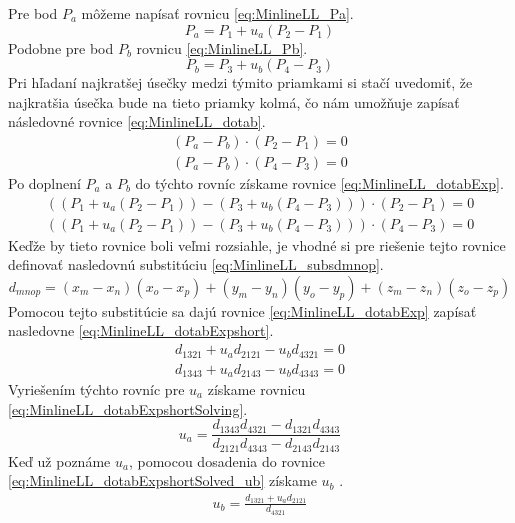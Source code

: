 Pre bod $P_a$ môžeme napísať rovnicu  \ref{eq:MinlineLL_Pa}.
\begin{equation}
P_a=P_1 + u_a(P_2-P_1)
    \label{eq:MinlineLL_Pa}
\end{equation}
Podobne pre bod $P_b$ rovnicu \ref{eq:MinlineLL_Pb}.
\begin{equation}
P_b=P_3 + u_b(P_4-P_3)
    \label{eq:MinlineLL_Pb}
\end{equation}
Pri hľadaní najkratšej úsečky medzi týmito priamkami si stačí uvedomiť, že najkratšia úsečka bude na tieto priamky kolmá, čo nám umožňuje zapísať následovné rovnice  \ref{eq:MinlineLL_dotab}.
\begin{equation}
\begin{aligned}
(P_a-P_b) \cdot (P_2-P_1) =0\\
(P_a-P_b) \cdot (P_4-P_3) =0
\end{aligned}
    \label{eq:MinlineLL_dotab}
\end{equation}
Po doplnení  $P_a$ a $P_b$ do týchto rovníc získame rovnice \ref{eq:MinlineLL_dotabExp}.
\begin{equation}
\begin{aligned}
((P_1 + u_a(P_2-P_1))-(P_3 + u_b(P_4-P_3))) \cdot (P_2-P_1) =0\\
((P_1 + u_a(P_2-P_1))-(P_3 + u_b(P_4-P_3))) \cdot (P_4-P_3) =0
\end{aligned}
    \label{eq:MinlineLL_dotabExp}
\end{equation}
Keďže by tieto rovnice boli veľmi rozsiahle, je vhodné si pre riešenie tejto rovnice definovať nasledovnú substitúciu \ref{eq:MinlineLL_subsdmnop}.
\begin{equation}
d_{mnop}=(x_m - x_n)(x_o-x_p)+(y_m - y_n)(y_o-y_p)+(z_m - z_n)(z_o-z_p)
    \label{eq:MinlineLL_subsdmnop}
\end{equation}
Pomocou tejto substitúcie sa dajú rovnice \ref{eq:MinlineLL_dotabExp} zapísať nasledovne \ref{eq:MinlineLL_dotabExpshort}.
\begin{equation}
\begin{aligned}
d_{1321} + u_a d_{2121} - u_b d_{4321} = 0\\
d_{1343} + u_a d_{2143} - u_b d_{4343} = 0
\end{aligned}
    \label{eq:MinlineLL_dotabExpshort}
\end{equation}
Vyriešením týchto rovníc pre $u_a$ získame rovnicu \ref{eq:MinlineLL_dotabExpshortSolving}.
\begin{equation}
 u_a= \frac
 {d_{1343} d_{4321} - d_{1321} d_{4343} }
 {d_{2121} d_{4343} - d_{2143} d_{2143} }
    \label{eq:MinlineLL_dotabExpshortSolving}
\end{equation}
Keď už poznáme $u_a$, pomocou dosadenia do rovnice \ref{eq:MinlineLL_dotabExpshortSolved_ub} získame $u_b$ \cite{bourke_Point_Line_Plane}.
\begin{equation}
\begin{aligned}
u_b  = \frac{d_{1321} + u_a d_{2121}}{d_{4321}}
\end{aligned}
    \label{eq:MinlineLL_dotabExpshortSolved_ub}
\end{equation}



